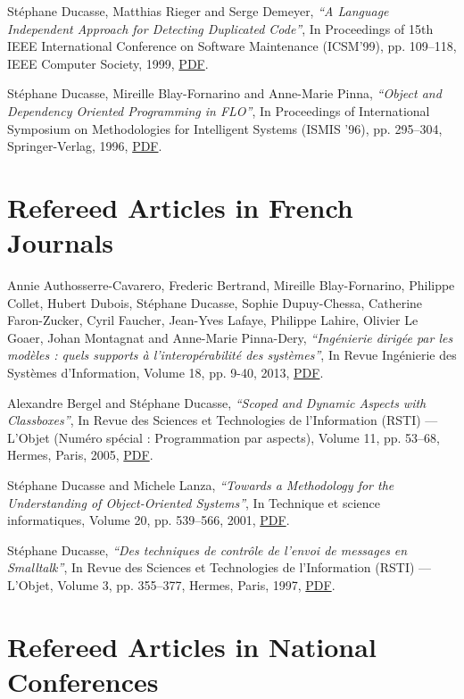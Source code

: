 \documentclass{article}
\newcommand{\czauthors}[1]{#1}
\newcommand{\cztitle}[1]{\emph{``#1''}}
\newcommand{\czjournal}[1]{#1}
\newcommand{\czbooktitle}[1]{#1}
\begin{document}
\begin{itemize}
	\pub  \czauthors{St\'ephane Ducasse, Matthias Rieger and Serge Demeyer},  \cztitle{A Language Independent Approach for Detecting Duplicated Code},  In \czbooktitle{Proceedings of 15th IEEE International Conference on Software Maintenance (ICSM'99)}, pp. 109--118, IEEE Computer Society, 1999, \href{http://rmod-files.lille.inria.fr/Team/Texts/Papers/Duca99bCodeDuplication.pdf}{PDF}.

	\pub  \czauthors{St\'ephane Ducasse, Mireille Blay-Fornarino and Anne-Marie Pinna},  \cztitle{Object and Dependency Oriented Programming in FLO},  In \czbooktitle{Proceedings of International Symposium on Methodologies for Intelligent Systems (ISMIS '96)}, pp. 295--304, Springer-Verlag, 1996, \href{http://rmod-files.lille.inria.fr/Team/Texts/Papers/Duca96bDependencyOP.pdf}{PDF}.

\end{itemize}\section{Refereed Articles in French Journals}

\begin{itemize}

	\pub  \czauthors{Annie Authosserre-Cavarero, Frederic Bertrand, Mireille Blay-Fornarino, Philippe Collet, Hubert Dubois, St\'ephane Ducasse, Sophie Dupuy-Chessa, Catherine Faron-Zucker, Cyril Faucher, Jean-Yves Lafaye, Philippe Lahire, Olivier Le Goaer, Johan Montagnat and Anne-Marie Pinna-Dery},  \cztitle{Ing\'enierie dirig\'ee par les mod\`eles : quels supports \`a l'interop\'erabilit\'e des syst\`emes},  In \czjournal{Revue Ing\'enierie des Syst\`emes d'Information}, Volume 18, pp. 9-40, 2013, \href{http://rmod-files.lille.inria.fr/Team/Texts/Papers/Auth13a-interop-si-JournalVersion.pdf}{PDF}.

	\pub  \czauthors{Alexandre Bergel and St\'ephane Ducasse},  \cztitle{Scoped and Dynamic Aspects with {Classboxes}},  In \czjournal{Revue des Sciences et Technologies de l'Information (RSTI) --- L'Objet (Num\'ero sp\'ecial : Programmation par aspects)}, Volume 11, pp. 53--68, Hermes, Paris, 2005, \href{http://rmod-files.lille.inria.fr/Team/Texts/Papers/Berg05eDynamicClassboxes.pdf}{PDF}.

	\pub  \czauthors{St\'ephane Ducasse and Michele Lanza},  \cztitle{Towards a Methodology for the Understanding of Object-Oriented Systems},  In \czjournal{Technique et science informatiques}, Volume 20, pp. 539--566, 2001, \href{http://rmod-files.lille.inria.fr/Team/Texts/Papers/Duca01aTowardsAMethod.pdf}{PDF}.

	\pub  \czauthors{St\'ephane Ducasse},  \cztitle{Des techniques de contr\^ole de l'envoi de messages en {Smalltalk}},  In \czjournal{Revue des Sciences et Technologies de l'Information (RSTI) --- L'Objet}, Volume 3, pp. 355--377, Hermes, Paris, 1997, \href{http://rmod-files.lille.inria.fr/Team/Texts/Papers/Duca97eMessagePassing.pdf}{PDF}.

\end{itemize}\section{Refereed Articles in National Conferences}
\end{document}
